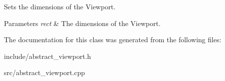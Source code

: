 Sets the dimensions of the Viewport. 


\begin{DoxyParams}{Parameters}
{\em rect} & The dimensions of the Viewport. \\
\hline
\end{DoxyParams}


The documentation for this class was generated from the following files\+:\begin{DoxyCompactItemize}
\item 
include/abstract\+\_\+viewport.\+h\item 
src/abstract\+\_\+viewport.\+cpp\end{DoxyCompactItemize}
